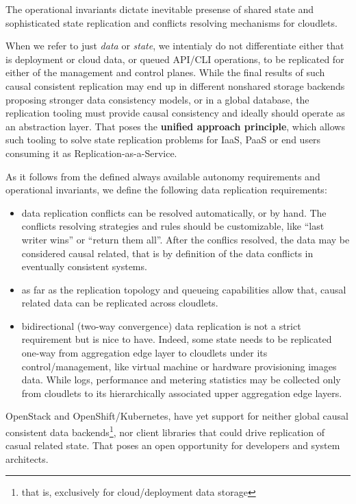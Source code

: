 \documentclass[conference]{IEEEtran}
\begin{document}
The operational invariants dictate inevitable presense of shared state and
sophisticated state replication and conflicts resolving
mechanisms for cloudlets.

When we refer to just \textit{data} or \textit{state}, we intentialy do not
differentiate either that is deployment or cloud data, or queued API/CLI
operations, to be replicated for either of the management and control planes.
While the final results of such causal consistent replication may end up in
different nonshared storage backends proposing stronger data consistency
models, or in a global database, the replication tooling must provide causal
consistency and ideally should operate as an abstraction layer. That poses the
\textbf{unified approach principle}, which allows such tooling to solve state
replication problems for IaaS, PaaS or end users consuming it as
Replication-as-a-Service.

As it follows from the defined always available autonomy requirements and
operational invariants, we define the following data replication requirements:

\begin{itemize}
  \item data replication conflicts can be resolved automatically, or by hand.
    The conflicts resolving strategies and rules should be customizable, like
    ``last writer wins'' or ``return them all''. After the conflics resolved,
    the data may be considered causal related, that is by definition\cite{b1}
    of the data conflicts in eventually consistent systems.
  \item as far as the replication topology and queueing capabilities allow
    that, causal related data can be replicated across cloudlets.
  \item bidirectional (two-way convergence) data replication is not a strict
    requirement but is nice to have. Indeed, some state needs to be replicated
    one-way from aggregation edge layer to cloudlets under its
    control/management, like virtual machine or hardware provisioning images
    data. While logs, performance and metering statistics may be collected only
    from cloudlets to its hierarchically associated upper aggregation edge
    layers.
\end{itemize}

OpenStack and OpenShift/Kubernetes, have yet support for neither global causal
consistent data backends\footnote{that is, exclusively for cloud/deployment
data storage}, nor client libraries that could drive replication of casual
related state. That poses an open opportunity for developers and system
architects.
\end{document}
